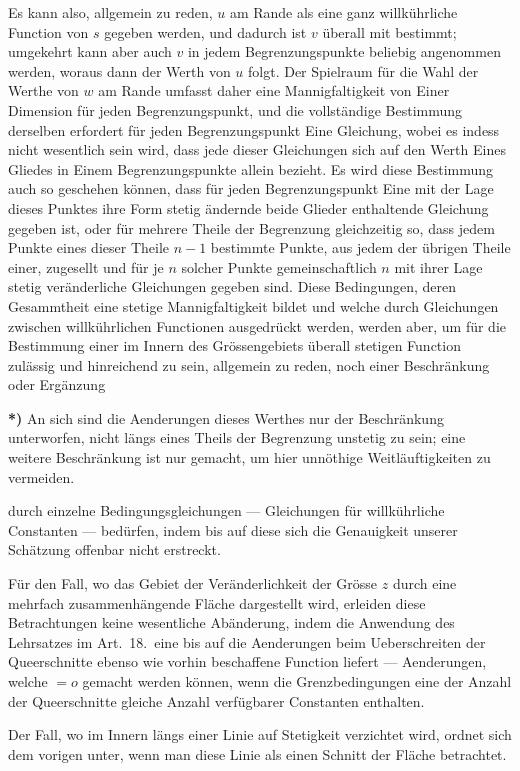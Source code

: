 \documentclass{article}
\begin{document}
Es kann also, allgemein zu reden, $u$ am Rande als eine ganz willkührliche Function von $s$ gegeben werden, und dadurch ist $v$ überall mit bestimmt; umgekehrt kann aber auch $v$ in jedem Begrenzungspunkte beliebig angenommen werden, woraus dann der Werth von $u$ folgt. Der Spielraum für die Wahl der Werthe von $w$ am Rande umfasst daher eine Mannigfaltigkeit von Einer Dimension für jeden Begrenzungspunkt, und die vollständige Bestimmung derselben erfordert für jeden Begrenzungspunkt Eine Gleichung, wobei es indess nicht wesentlich sein wird, dass jede dieser Gleichungen sich auf den Werth Eines Gliedes in Einem Begrenzungspunkte allein bezieht. Es wird diese Bestimmung auch so geschehen können, dass für jeden Begrenzungspunkt Eine mit der Lage dieses Punktes ihre Form stetig ändernde beide Glieder enthaltende Gleichung gegeben ist, oder für mehrere Theile der Begrenzung gleichzeitig so, dass jedem Punkte eines dieser Theile $n - 1$ bestimmte Punkte, aus jedem der übrigen Theile einer, zugesellt und für je $n$ solcher Punkte gemeinschaftlich $n$ mit ihrer Lage stetig veränderliche Gleichungen gegeben sind. Diese Bedingungen, deren Gesammtheit eine stetige Mannigfaltigkeit bildet und welche durch Gleichungen zwischen willkührlichen Functionen ausgedrückt werden, werden aber, um für die Bestimmung einer im Innern des Grössengebiets überall stetigen Function zulässig und hinreichend zu sein, allgemein zu reden, noch einer Beschränkung oder Ergänzung

\textbf{*)} An sich sind die Aenderungen dieses Werthes nur der Beschränkung unterworfen, nicht längs eines Theils der Begrenzung unstetig zu sein; eine weitere Beschränkung ist nur gemacht, um hier unnöthige Weitläuftigkeiten zu vermeiden.

durch einzelne Bedingungsgleichungen --- Gleichungen für willkührliche Constanten --- bedürfen, indem bis auf diese sich die Genauigkeit unserer Schätzung offenbar nicht erstreckt.

Für den Fall, wo das Gebiet der Veränderlichkeit der Grösse $z$ durch eine mehrfach zusammenhängende Fläche dargestellt wird, erleiden diese Betrachtungen keine wesentliche Abänderung, indem die Anwendung des Lehrsatzes im Art.~18.\ eine bis auf die Aenderungen beim Ueberschreiten der Queerschnitte ebenso wie vorhin beschaffene Function liefert --- Aenderungen, welche $= o$ gemacht werden können, wenn die Grenzbedingungen eine der Anzahl der Queerschnitte gleiche Anzahl verfügbarer Constanten enthalten.

Der Fall, wo im Innern längs einer Linie auf Stetigkeit verzichtet wird, ordnet sich dem vorigen unter, wenn man diese Linie als einen Schnitt der Fläche betrachtet.
\end{document}

